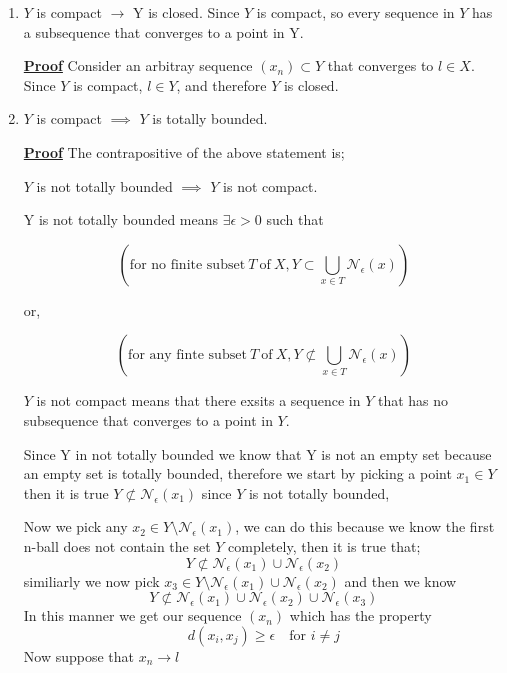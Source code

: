 \documentclass[12pt,a4paper]{article}
\begin{document}
\begin{enumerate}
    \item \(Y\) is compact \(\to\) Y is closed.
    Since \(Y\) is compact, so every sequence in \(Y\) has a subsequence that converges to a point in Y.  
    \begin{tcolorbox}
        \underline{\textbf{Proof}}
        Consider an arbitray sequence \(\left( x_{n} \right) \subset Y\) that converges to 
        \(l \in X \). Since \(Y\) is compact, \(l \in Y\), and therefore \(Y\) is closed.   
    \end{tcolorbox}
    \item \(Y\) is compact \(\implies \) \(Y\) is totally bounded.  
    
    \underline{\textbf{Proof}}
    The contrapositive of the above statement is;

    \(Y \) is not totally bounded \(\implies\) \(Y\) is not compact.    

    Y is not totally bounded means \(\exists \epsilon >0\) such that
    
    \[\left( \text{for no finite subset} \ T \ \text{of} \ X, Y \subset \bigcup_{x \in T} \mathcal{N}_{\epsilon}(x) \right) \]  

    or, 

    \[ \left( \text{for any finte subset} \ T \ \text{of} \ X, Y \not\subset \bigcup_{x \in T} \mathcal{N}_{\epsilon}(x) \right) \] 
    
    \(Y\)  is not compact means that there exsits a sequence in \(Y\) that has no subsequence that converges to a point in \(Y\).
    
    Since Y in not totally bounded we know that Y is not an empty set because an empty set is totally bounded, therefore we start by picking a point \(x_{1} \in Y\) then it is true \(Y \not\subset \mathcal{N}_{\epsilon}(x_{1})\) since \(Y \) is not totally bounded, 

    Now we pick any \(x_{2} \in Y \setminus \mathcal{N}_{\epsilon}(x_{1})\), we can do this because we know the first n-ball does not contain the set \(Y\) completely, then it is true that;
    \[ Y \not\subset \mathcal{N}_{\epsilon}(x_{1}) \cup \mathcal{N}_{\epsilon}(x_{2}) \]
    similiarly we now pick \(x_{3} \in Y \setminus \mathcal{N}_{\epsilon}(x_{1}) \cup \mathcal{N}_{\epsilon}(x_{2})\) and then we know 
    \begin{equation*}
        Y \not\subset \mathcal{N}_{\epsilon}(x_{1}) \cup \mathcal{N}_{\epsilon}(x_{2}) \cup \mathcal{N}_{\epsilon}(x_{3})
    \end{equation*}    
    In this manner we get our sequence \(\left( x_{n} \right) \) which has the property 
    \begin{equation*}
        d(x_{i},x_{j}) \geq \epsilon \quad \text{for } i \neq j
    \end{equation*}    
    Now suppose that \(x_{n} \to l\)
    

\end{enumerate}
\end{document}

